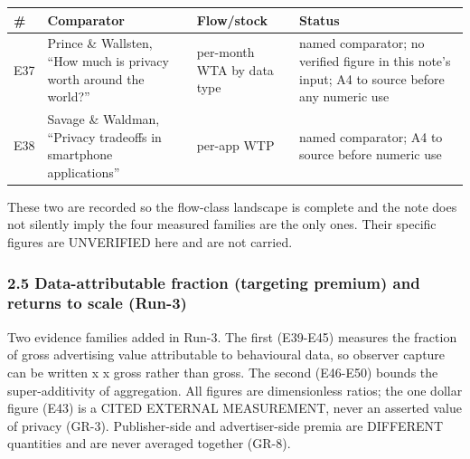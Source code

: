 \documentclass[
  11pt,
]{article}
\newcounter{none} %
\begin{document}
{\def\LTcaptype{none} %
\begin{longtable}[]{@{}
  >{\raggedright\arraybackslash}p{}
  >{\raggedright\arraybackslash}p{}
  >{\raggedright\arraybackslash}p{}
  >{\raggedright\arraybackslash}p{}@{}}
\toprule\noalign{}
\begin{minipage}[b]{\linewidth}\raggedright
\#
\end{minipage} & \begin{minipage}[b]{\linewidth}\raggedright
Comparator
\end{minipage} & \begin{minipage}[b]{\linewidth}\raggedright
Flow/stock
\end{minipage} & \begin{minipage}[b]{\linewidth}\raggedright
Status
\end{minipage} \\
\midrule\noalign{}
\endhead
\bottomrule\noalign{}
\endlastfoot
E37 & Prince \& Wallsten, ``How much is privacy worth around the
world?'' & per-month WTA by data type & named comparator; no verified
figure in this note's input; A4 to source before any numeric use \\
E38 & Savage \& Waldman, ``Privacy tradeoffs in smartphone
applications'' & per-app WTP & named comparator; A4 to source before
numeric use \\
\end{longtable}
}

These two are recorded so the flow-class landscape is complete and the
note does not silently imply the four measured families are the only
ones. Their specific figures are UNVERIFIED here and are not carried.

\subsubsection{2.5 Data-attributable fraction (targeting premium) and
returns to scale
(Run-3)}\label{data-attributable-fraction-targeting-premium-and-returns-to-scale-run-3}

Two evidence families added in Run-3. The first (E39-E45) measures the
fraction of gross advertising value attributable to behavioural data, so
observer capture can be written x x gross rather than gross. The second
(E46-E50) bounds the super-additivity of aggregation. All figures are
dimensionless ratios; the one dollar figure (E43) is a CITED EXTERNAL
MEASUREMENT, never an asserted value of privacy (GR-3). Publisher-side
and advertiser-side premia are DIFFERENT quantities and are never
averaged together (GR-8).
\end{document}
